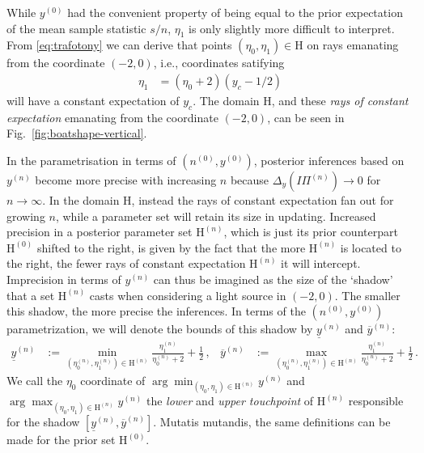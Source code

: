 \documentclass[runningheads,a4paper]{llncs}
\newcommand{\uz}{^{(0)}} %
\newcommand{\un}{^{(n)}} %
\newcommand{\ul}[1]{\underline{#1}}
\newcommand{\ol}[1]{\overline{#1}}
\def\yz{y\uz}
\def\yn{y\un}
\def\ynl{\ul{y}\un}
\def\ynu{\ol{y}\un}
\def\nz{n\uz}
\def\PN{I\!\!\Pi\un}
\def\Eta{\mathrm{H}}
\def\EZ{\mathrm{H}\uz}
\def\EN{\mathrm{H}\un}
\newcommand{\ez}{\eta_0}
\def\ezn{\eta_0\un}
\def\eon{\eta_1\un}
\begin{document}
While $\yz$ had the convenient property of being equal to
the prior expectation of the mean sample statistic $s/n$,
$\eta_1$ is only slightly more difficult to interpret.
From \eqref{eq:trafotony} we can derive that points $(\eta_0,\eta_1) \in \Eta$
on rays emanating from the coordinate $(-2,0)$,
i.e., coordinates satifying
\begin{align}
\label{eq:raysofconstantexpectation}
\eta_1 &= (\eta_0 + 2)(y_c - 1/2) 
\end{align}
will have a constant expectation of $y_c$.
The domain $\Eta$, and these \emph{rays of constant expectation} emanating from the coordinate $(-2,0)$,
can be seen in Fig.~\ref{fig:boatshape-vertical}.

In the parametrisation in terms of $(\nz,\yz)$,
posterior inferences based on $\yn$ become more precise with increasing $n$
because $\Delta_y(\PN) \to 0$ for $n \to \infty$.
In the domain $\Eta$, %
instead the rays of constant expectation fan out for growing $n$,
while a parameter set will retain its size in updating.
Increased precision in a posterior parameter set $\EN$, which is just
its prior counterpart $\EZ$ shifted to the right,
is given by the fact that the more $\EN$ is located to the right,
the fewer rays of constant expectation $\EN$ it will intercept.
Imprecision in terms of $\yn$
can thus be imagined as the size of the `shadow' that a set $\EN$ casts
when considering a light source in $(-2,0)$. %
The smaller this shadow, the more precise the inferences.
In terms of the $(\nz, \yz)$ parametrization, we will denote the bounds of this shadow by $\ynl$ and $\ynu$:
\begin{align*}
\ynl &:= \min_{(\ezn,\eon) \in \EN} \frac{\eon}{\ezn+2} + \frac{1}{2}\,, &
\ynu &:= \max_{(\ezn,\eon) \in \EN} \frac{\eon}{\ezn+2} + \frac{1}{2}\,.
\end{align*}
We call the $\ez$ coordinate of $\arg\min_{(\eta_0,\eta_1) \in \EN} \yn$ and $\arg\max_{(\eta_0,\eta_1) \in \EN} \yn$
the \emph{lower} and \emph{upper touchpoint} of $\EN$ responsible for the shadow $[\ynl, \ynu]$.
Mutatis mutandis, the same definitions can be made for the prior set $\EZ$.
\end{document}
